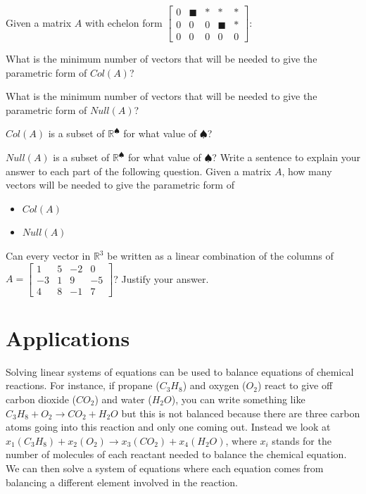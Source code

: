 \bq Given a matrix $A$ with echelon form $\begin{bmatrix} 0&\blacksquare&*&*&*\\0&0&0&\blacksquare&* \\ 0&0&0&0&0 \end{bmatrix}$:
\be
\item What is the minimum number of vectors that will be needed to give the parametric form of $Col(A)$?
\item What is the minimum number of vectors that will be needed to give the parametric form of $Null(A)$?
\item $Col(A)$ is a subset of $\mathbb{R}^\spadesuit$ for what value of $\spadesuit$?
\item $Null(A)$ is a subset of $\mathbb{R}^\spadesuit$ for what value of $\spadesuit$?
\ee
\eq
\bq\label{q10} Write a sentence to explain your answer to each part of the following question. Given a matrix $A$, how many vectors will be needed to give the parametric form of
\begin{itemize}
\item $Col(A)$
\item $Null(A)$
\end{itemize}
\eq
\bq Can every vector in $\mathbb{R}^3$ be written as a linear combination of the columns of $A = \begin{bmatrix} 1&5&-2&0 \\ -3&1&9&-5 \\ 4&8&-1&7 \end{bmatrix}$? Justify your answer.
\eq

\section{Applications}
Solving linear systems of equations can be used to balance equations of chemical reactions. For instance, if propane ($C_3H_8$) and oxygen ($O_2$) react to give off carbon dioxide ($CO_2$) and water ($H_2O$), you can write something like $C_3H_8 +O_2 \rightarrow CO_2+H_2O$ but this is not balanced because there are three carbon atoms going into this reaction and only one coming out. Instead we look at $x_1 (C_3H_8) +x_2 (O_2) \rightarrow x_3(CO_2)+x_4(H_2O)$, where $x_i$ stands for the number of molecules of each reactant needed to balance the chemical equation. We can then solve a system of equations where each equation comes from balancing a different element involved in the reaction.
\begin{annotation}
\end{annotation}

